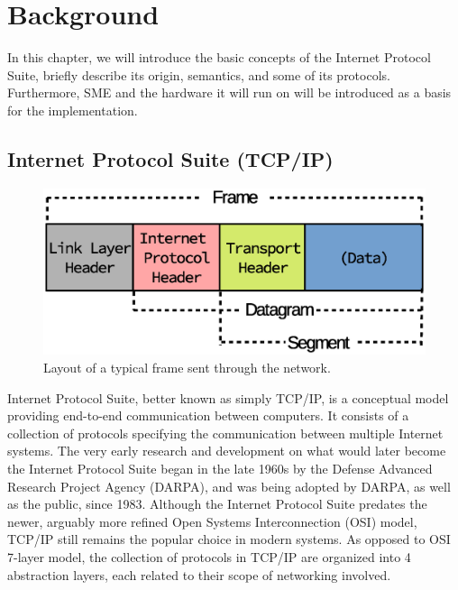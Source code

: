 \chapter{Background}

In this chapter, we will introduce the basic concepts of the Internet Protocol
Suite, briefly describe its origin, semantics, and some of its protocols.
Furthermore, SME and the hardware it will run on will be introduced as a basis
for the implementation.


\section{Internet Protocol Suite (TCP/IP)}
\begin{figure}
\centering
\includegraphics[scale=0.425]{background/frame.eps}
\caption{Layout of a typical frame sent through the network.}
\label{fig:frame_layout}
\end{figure}


Internet Protocol Suite, better known as simply TCP/IP, is a conceptual
model providing end-to-end communication between computers. It consists of
a collection of protocols specifying the communication between multiple
Internet systems\cite{RFC1122}.  The very early research and development
on what would later become the Internet Protocol Suite began in the late 1960s
by the Defense Advanced Research Project Agency (DARPA), and was being
adopted by DARPA, as well as the public, since 1983\cite{DARPA_internet}.
Although the Internet Protocol Suite predates the newer, arguably more
refined Open Systems Interconnection (OSI) model, TCP/IP still
remains the popular choice in modern systems.  As opposed to OSI 7-layer
model\cite{X.200}, the collection of protocols in TCP/IP are organized
into 4 abstraction layers, each related to their scope of networking
involved.

